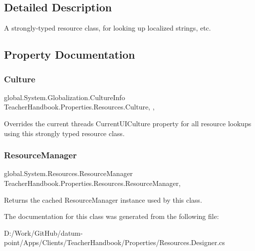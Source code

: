 \subsection{Detailed Description}
A strongly-\/typed resource class, for looking up localized strings, etc. 



\subsection{Property Documentation}
\mbox{\label{class_teacher_handbook_1_1_properties_1_1_resources_a7d2a69e42deca52f95de104f0283705c}} 
\subsubsection{\texorpdfstring{Culture}{Culture}}
{\footnotesize\ttfamily global.\+System.\+Globalization.\+Culture\+Info Teacher\+Handbook.\+Properties.\+Resources.\+Culture\hspace{0.3cm}{\ttfamily [static]}, {\ttfamily [get]}, {\ttfamily [set]}}



Overrides the current thread\textquotesingle{}s Current\+U\+I\+Culture property for all resource lookups using this strongly typed resource class. 

\mbox{\label{class_teacher_handbook_1_1_properties_1_1_resources_a21ca51d6f85c0dfdff618767488d942f}} 
\subsubsection{\texorpdfstring{Resource\+Manager}{ResourceManager}}
{\footnotesize\ttfamily global.\+System.\+Resources.\+Resource\+Manager Teacher\+Handbook.\+Properties.\+Resources.\+Resource\+Manager\hspace{0.3cm}{\ttfamily [static]}, {\ttfamily [get]}}



Returns the cached Resource\+Manager instance used by this class. 



The documentation for this class was generated from the following file\+:\begin{DoxyCompactItemize}
\item 
D\+:/\+Work/\+Git\+Hub/datum-\/point/\+Apps/\+Clients/\+Teacher\+Handbook/\+Properties/Resources.\+Designer.\+cs\end{DoxyCompactItemize}
